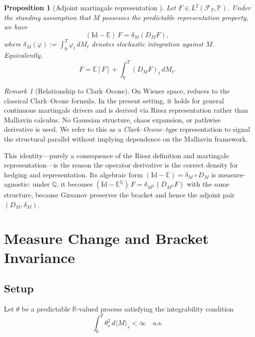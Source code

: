 \documentclass[11pt]{article}
\theoremstyle{plain}
\newtheorem{proposition}{Proposition}[section]
\theoremstyle{definition}
\theoremstyle{remark}
\newtheorem{remark}{Remark}[section]
\newcommand{\R}{\mathbb{R}}
\newcommand{\E}{\mathbb{E}}
\newcommand{\F}{\mathcal{F}}
\newcommand{\PP}{\mathbb{P}}
\newcommand{\QQ}{\mathbb{Q}}
\newcommand{\bracket}[1]{\langle #1 \rangle}
\begin{document}
\begin{proposition}[Adjoint martingale representation {\cite{Fontes2026a}}]\label{prop:clark-ocone-P}
Let $F \in L^2(\F_T, \PP)$. Under the standing assumption that $M$
possesses the predictable representation property, we have
\begin{equation}\label{eq:factorization}
(\mathrm{Id} - \E)\,F = \delta_M(D_M F),
\end{equation}
where $\delta_M(\varphi) := \int_0^T \varphi_t\,dM_t$ denotes stochastic
integration against $M$. Equivalently,
\[
F = \E[F] + \int_0^T (D_M F)_t\,dM_t.
\]
\end{proposition}

\begin{remark}[Relationship to Clark--Ocone]\label{rem:clark-ocone-distinction}
On Wiener space,  reduces to the classical
Clark--Ocone formula. In the present setting, it holds for general continuous
martingale drivers and is derived via Riesz representation rather than
Malliavin calculus. No Gaussian structure, chaos expansion, or pathwise
derivative is used. We refer to this as a \emph{Clark--Ocone--type}
representation to signal the structural parallel without implying
dependence on the Malliavin framework.
\end{remark}

This identity---purely a consequence of the Riesz definition and
martingale representation---is the reason the operator derivative is the
correct density for hedging and representation. Its algebraic form
$(\mathrm{Id} - \E) = \delta_M \circ D_M$ is measure-agnostic: under
$\QQ$, it becomes $(\mathrm{Id} - \E^{\QQ})\,F = \delta_{M^{\QQ}}(D_{M^{\QQ}} F)$
with the same structure, because Girsanov preserves the bracket and hence
the adjoint pair $(D_M, \delta_M)$.

\section{Measure Change and Bracket Invariance}\label{sec:girsanov}

\subsection{Setup}

Let $\theta$ be a predictable $\R$-valued process satisfying the integrability
condition
\begin{equation}\label{eq:theta-int}
\int_0^T \theta_s^2\,d\bracket{M}_s < \infty \quad \text{a.s.}
\end{equation}
\end{document}
